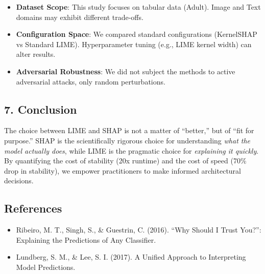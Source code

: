\documentclass[
]{article}
\providecommand{\tightlist}{%
  \setlength{\itemsep}{0pt}\setlength{\parskip}{0pt}}
\begin{document}
\begin{itemize}
\tightlist
\item
  \textbf{Dataset Scope}: This study focuses on tabular data (Adult).
  Image and Text domains may exhibit different trade-offs.
\item
  \textbf{Configuration Space}: We compared standard configurations
  (KernelSHAP vs Standard LIME). Hyperparameter tuning (e.g., LIME
  kernel width) can alter results.
\item
  \textbf{Adversarial Robustness}: We did not subject the methods to
  active adversarial attacks, only random perturbations.
\end{itemize}

\hypertarget{conclusion}{%
\subsection{7. Conclusion}\label{conclusion}}

The choice between LIME and SHAP is not a matter of ``better,'' but of
``fit for purpose.'' SHAP is the scientifically rigorous choice for
understanding \emph{what the model actually does}, while LIME is the
pragmatic choice for \emph{explaining it quickly}. By quantifying the
cost of stability (20x runtime) and the cost of speed (70\% drop in
stability), we empower practitioners to make informed architectural
decisions.

\hypertarget{references}{%
\subsection{References}\label{references}}

\begin{itemize}
\tightlist
\item
  Ribeiro, M. T., Singh, S., \& Guestrin, C. (2016). ``Why Should I
  Trust You?'': Explaining the Predictions of Any Classifier.
\item
  Lundberg, S. M., \& Lee, S. I. (2017). A Unified Approach to
  Interpreting Model Predictions.
\end{itemize}
\end{document}
